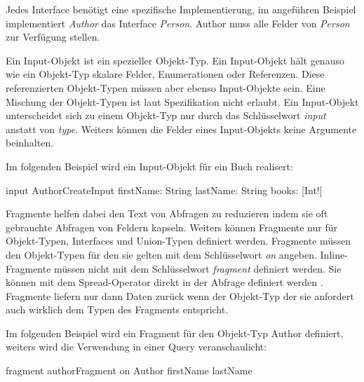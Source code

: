 Jedes Interface benötigt eine spezifische Implementierung, im angeführen Beispiel implementiert \textit{Author} das Interface \textit{Person}.
Author muss alle Felder von \textit{Person} zur Verfügung stellen.

Ein Input-Objekt ist ein spezieller Objekt-Typ. Ein Input-Objekt hält genauso wie ein Objekt-Typ skalare Felder, Enumerationen oder Referenzen.
Diese referenzierten Objekt-Typen müssen aber ebenso Input-Objekte sein.
Eine Mischung der Objekt-Typen ist laut Spezifikation nicht erlaubt.
Ein Input-Objekt unterscheidet sich zu einem Objekt-Typ nur durch das Schlüsselwort \textit{input} anstatt von \textit{type}.
Weiters können die Felder eines Input-Objekts keine Argumente beinhalten.
\newline


Im folgenden Beispiel wird ein Input-Objekt für ein Buch realisert:
\begin{JsCode}
input AuthorCreateInput {
  firstName: String
  lastName: String
  books: [Int!]
}
\end{JsCode}


Fragmente helfen dabei den Text von Abfragen zu reduzieren indem sie oft gebrauchte Abfragen von Feldern kapseln.
Weiters können Fragmente nur für Objekt-Typen, Interfaces und Union-Typen definiert werden.
Fragmente müssen den Objekt-Typen für den sie gelten mit dem Schlüsselwort  \textit{on} angeben.
Inline-Fragmente müssen nicht mit dem Schlüsselwort \textit{fragment} definiert werden.
Sie können mit dem Spread-Operator direkt in der Abfrage definiert werden \parencite[Abs. 2.8 -  2.8.1]{graphqlOnline}.
Fragmente liefern nur dann Daten zurück wenn der Objekt-Typ der sie anfordert auch wirklich dem Typen des Fragments entspricht.

Im folgenden Beispiel wird ein Fragment für den Objekt-Typ Author definiert, weiters wird die Verwendung in einer Query veranschaulicht:
\begin{JsCode}
fragment authorFragment on Author {
    firstName
    lastName
}

\end{JsCode}



